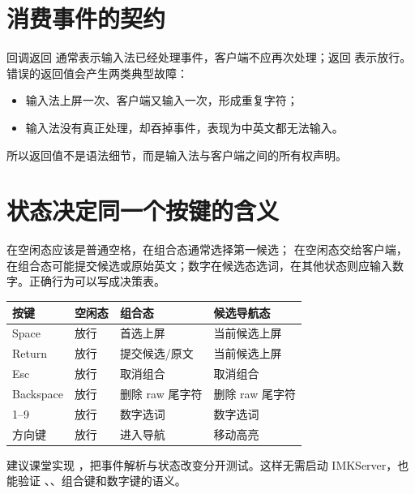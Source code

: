 

\section{消费事件的契约}

回调返回  通常表示输入法已经处理事件，客户端不应再次处理；返回  表示放行。错误的返回值会产生两类典型故障：

\begin{itemize}
  \item 输入法上屏一次、客户端又输入一次，形成重复字符；
  \item 输入法没有真正处理，却吞掉事件，表现为中英文都无法输入。
\end{itemize}

所以返回值不是语法细节，而是输入法与客户端之间的所有权声明。

\section{状态决定同一个按键的含义}

 在空闲态应该是普通空格，在组合态通常选择第一候选； 在空闲态交给客户端，在组合态可能提交候选或原始英文；数字在候选态选词，在其他状态则应输入数字。正确行为可以写成决策表。

\begin{center}
\begin{tabular}{llll}
\toprule
按键 & 空闲态 & 组合态 & 候选导航态 \\
\midrule
Space & 放行 & 首选上屏 & 当前候选上屏 \\
Return & 放行 & 提交候选/原文 & 当前候选上屏 \\
Esc & 放行 & 取消组合 & 取消组合 \\
Backspace & 放行 & 删除 raw 尾字符 & 删除 raw 尾字符 \\
1--9 & 放行 & 数字选词 & 数字选词 \\
方向键 & 放行 & 进入导航 & 移动高亮 \\
\bottomrule
\end{tabular}
\end{center}

\begin{concept}[动作层]
建议课堂实现 ，把事件解析与状态改变分开测试。这样无需启动 IMKServer，也能验证 、、组合键和数字键的语义。
\end{concept}

